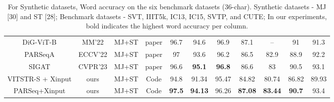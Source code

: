 \documentclass[runningheads]{llncs}
\begin{document}
\begin{table}[htbp]
\begin{tabular}{ccccccccccc}
  DiG-ViT-B\cite{yang2022reading_DiGVITB}      & MM’22                  & MJ+ST                          & paper\cite{zhao2023clip4str}                                                                                  & 96.7          & 94.6           & 96.9          & 87.1           & –              & 91            & 91.3          \\
  PARSeqA\cite{bautista2022parseq}        & ECCV’22                & MJ+ST                          & paper\cite{zhao2023clip4str}                                                                                  & 97            & 93.6           & 96.2          & 86.5           & 82.9           & 88.9          & 92.2          \\
  SIGAT\cite{guan2023self_SIGAT}          & CVPR’23                & MJ+ST                          & paper\cite{zhao2023clip4str}                                                                                  & 96.6          & \textbf{95.1}  & \textbf{96.8} & 86.6           & 83             & 90.5          & 93.1          \\ \hline
  VITSTR-S + Xinput       & ours                   & MJ+ST                          & \multicolumn{1}{c}{Code}                                                                                & 94.8          & 91.34          & 95.47         & 84.82          & 80.74          & 86.82         & 89.93         \\
  PARSeq+Xinput           & ours                   & MJ+ST                          & \multicolumn{1}{c}{Code}                                                                                & \textbf{97.5} & \textbf{94.13} & 96.26         & \textbf{87.08} & \textbf{83.44} & \textbf{90.7} & 93.4          \\ \hline
  \end{tabular}
  \caption[short]{
    For Synthetic datasets, Word accuracy on the six benchmark datasets (36-char). Synthetic datasets - MJ [30] and ST [28]; Benchmark datasets - SVT, IIIT5k, IC13, IC15, SVTP, and CUTE; In our experiments, bold indicates the highest word accuracy per column. 
  } \label{table:Synres}

\end{table}
\end{document}
